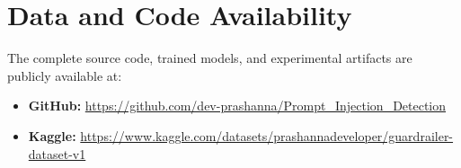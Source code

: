 \documentclass[12pt,a4paper]{article}
\begin{document}
\section*{Data and Code Availability}

The complete source code, trained models, and experimental artifacts are publicly available at:
\begin{itemize}[leftmargin=*]
    \item \textbf{GitHub:} \url{https://github.com/dev-prashanna/Prompt\_Injection\_Detection}
    \item \textbf{Kaggle:} \url{https://www.kaggle.com/datasets/prashannadeveloper/guardrailer-dataset-v1}
\end{itemize}



\end{document}
